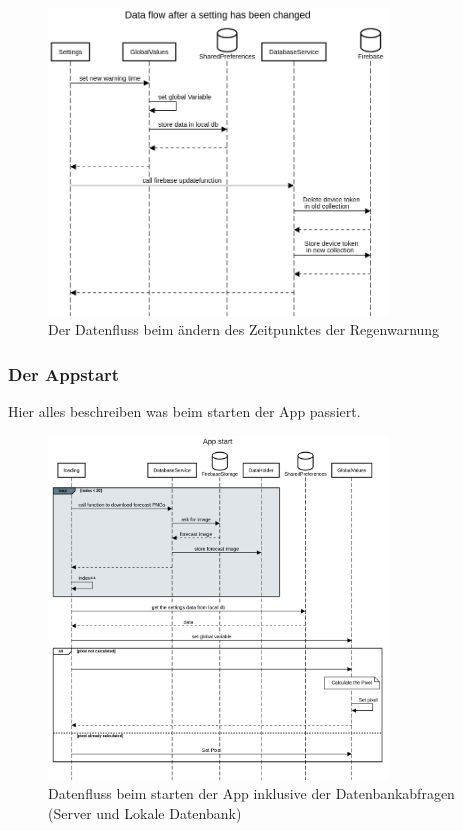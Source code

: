 \begin{figure}[H]
 \centering
 \includegraphics[width=0.8\textwidth,angle=0]{abb/sequence_diagram_change_settings}
 \caption[Sequencediagram Einstellungen ändern]{Der Datenfluss beim ändern des Zeitpunktes der Regenwarnung}
\label{fig:sequence_diagram_change_settings}
\end{figure}

\subsubsection{Der Appstart}
Hier alles beschreiben was beim starten der App passiert. 

\begin{figure}[H]
 \centering
 \includegraphics[width=0.8\textwidth,angle=0]{abb/sequence_diagram_app_start}
 \caption[Sequencediagram Appstart]{Datenfluss beim starten der App inklusive der Datenbankabfragen (Server und Lokale Datenbank)}
\label{fig:sequence_diagram_app_start}
\end{figure}

